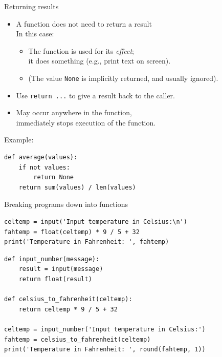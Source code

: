 \documentclass[aspectratio=169,usenames,dvipsnames]{beamer}
\begin{document}
\begin{frame}[fragile]{Returning results}
    \begin{itemize}
        \item A function does not need to return a result \\
            In this case:
            \begin{itemize}
                \item The function is used for its \emph{effect};\\
                    it does something (e.g., print text on screen).
                \item (The value \lstinline{None} is implicitly returned,
                        and usually ignored).
            \end{itemize}
        \item Use \lstinline{return ...}
            to give a result back to the caller.
        \item May occur anywhere in the function,\\
                immediately stops execution of the function.
    \end{itemize}

Example:
\begin{lstlisting}
def average(values):
    if not values:
        return None
    return sum(values) / len(values)
\end{lstlisting}
\end{frame}

\begin{frame}[fragile]{Breaking programs down into functions}
\begin{lstlisting}
celtemp = input('Input temperature in Celsius:\n')
fahtemp = float(celtemp) * 9 / 5 + 32
print('Temperature in Fahrenheit: ', fahtemp)
\end{lstlisting}

\pause\vspace{1em}
\begin{lstlisting}
def input_number(message):
    result = input(message)
    return float(result)

def celsius_to_fahrenheit(celtemp):
    return celtemp * 9 / 5 + 32

celtemp = input_number('Input temperature in Celsius:')
fahtemp = celsius_to_fahrenheit(celtemp)
print('Temperature in Fahrenheit: ', round(fahtemp, 1))
\end{lstlisting}
\end{frame}
\end{document}
